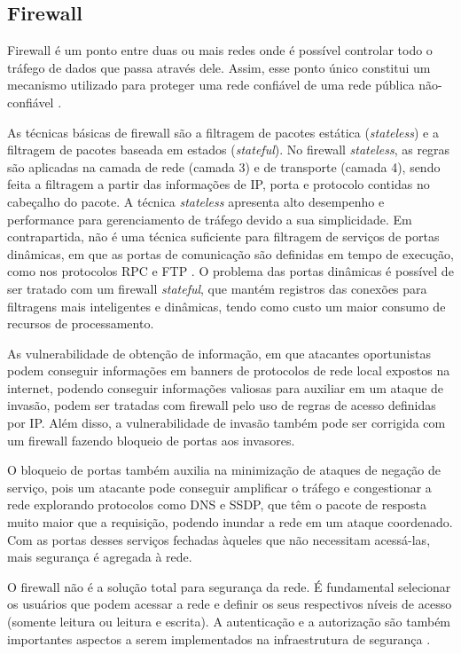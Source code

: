 \subsection{Firewall}

    Firewall é um ponto entre duas ou mais redes onde é possível controlar todo o tráfego de dados que passa através dele. Assim, esse ponto único constitui um mecanismo utilizado para proteger uma rede confiável de uma rede pública não-confiável \cite{nakamura2007}.
    
    As técnicas básicas de firewall são a filtragem de pacotes estática (\textit{stateless}) e a filtragem de pacotes baseada em estados (\textit{stateful}). No firewall \textit{stateless}, as regras são aplicadas na camada de rede (camada 3) e de transporte (camada 4), sendo feita a filtragem a partir das informações de IP, porta e protocolo contidas no cabeçalho do pacote. A técnica \textit{stateless} apresenta alto desempenho e performance para gerenciamento de tráfego devido a sua simplicidade. Em contrapartida, não é uma técnica suficiente para filtragem de serviços de portas dinâmicas, em que as portas de comunicação são definidas em tempo de execução, como nos protocolos RPC e FTP \cite{nakamura2007}. O problema das portas dinâmicas é possível de ser tratado com um firewall \textit{stateful}, que mantém registros das conexões para filtragens mais inteligentes e dinâmicas, tendo como custo um maior consumo de recursos de processamento.
    
    As vulnerabilidade de obtenção de informação, em que atacantes oportunistas podem conseguir informações em banners de protocolos de rede local expostos na internet, podendo conseguir informações valiosas para auxiliar em um ataque de invasão, podem ser tratadas com firewall pelo uso de regras de acesso definidas por IP. Além disso, a vulnerabilidade de invasão também pode ser corrigida com um firewall fazendo bloqueio de portas aos invasores. 

    O bloqueio de portas também auxilia na minimização de ataques de negação de serviço, pois um atacante pode conseguir amplificar o tráfego e congestionar a rede explorando protocolos como DNS e SSDP, que têm o pacote de resposta muito maior que a requisição, podendo inundar a rede em um ataque coordenado. Com as portas desses serviços fechadas àqueles que não necessitam acessá-las, mais segurança é agregada à rede.
    
    O firewall não é a solução total para segurança da rede. É fundamental selecionar os usuários que podem acessar a rede e definir os seus respectivos níveis de acesso (somente leitura ou leitura e escrita). A autenticação e a autorização são também importantes aspectos a serem implementados na infraestrutura de segurança \cite{nakamura2007}.

